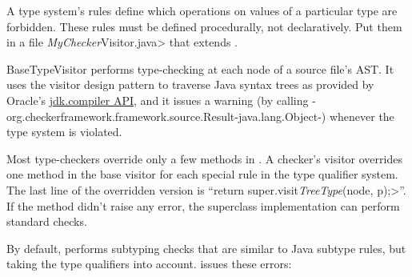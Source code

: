 


A type system's rules define which operations on values of a
particular type are forbidden.
These rules must be defined procedurally, not declaratively.
Put them in a file \<\emph{MyChecker}Visitor.java> that extends
.

BaseTypeVisitor performs type-checking at each node of a
source file's AST\@.  It uses the visitor design pattern to traverse
Java syntax trees as provided by Oracle's
\href{https://docs.oracle.com/en/java/javase/11/docs/api/jdk.compiler/module-summary.html}{jdk.compiler
API},
and it issues a warning (by calling
{-org.checkerframework.framework.source.Result-java.lang.Object-})
whenever the type system is violated.

Most type-checkers
override only a few methods in .
A checker's visitor overrides one method in the base visitor for each special
rule in the type qualifier system.
The last line of the overridden version is
``\<return super.visit\emph{TreeType}(node, p);>''.
If the method didn't raise any error,
the superclass implementation can perform standard checks.


By default,  performs subtyping checks that are
similar to Java subtype rules, but taking the type qualifiers into account.
 issues these errors:


